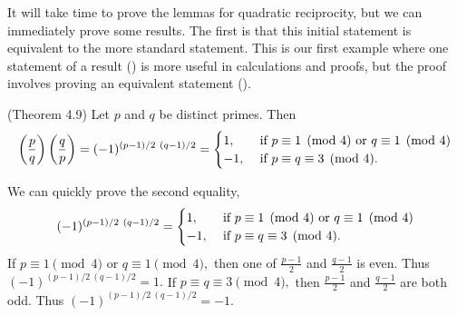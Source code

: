 \documentclass{ximera}
\begin{document}
It will take time to prove the lemmas for quadratic reciprocity, but we can immediately prove some results. 
The first is that this initial statement is equivalent to the more standard statement. This is our first example where one statement of a result () is more useful in calculations and proofs, but the proof involves proving an equivalent statement ().

\begin{theorem}\label{quad-rec-standard-form} (Theorem 4.9)
	Let $p$ and $q$ be distinct primes.  Then
	\[
		\legendre{p}{q}\legendre{q}{p}=(-1)^{(p-1)/2\ (q-1)/2}=
			\begin{cases}
 				1, & \textnormal{ if } p\equiv 1\pmod{4} \textnormal{ or } q\equiv 1\pmod{4}\\
				-1, & \textnormal{ if } p\equiv q\equiv 3\pmod{4}.
			\end{cases}
	\]
\end{theorem}

\begin{remark}
	We can quickly prove the second equality, 
		\[(-1)^{(p-1)/2\ (q-1)/2}=
			\begin{cases}
 				1, & \textnormal{ if } p\equiv 1\pmod{4} \textnormal{ or } q\equiv 1\pmod{4}\\
				-1, & \textnormal{ if } p\equiv q\equiv 3\pmod{4}.
			\end{cases}\]
	If $p\equiv 1\pmod{4}$ or $q\equiv 1\pmod{4},$ then one of $\frac{p-1}{2}$ and $\frac{q-1}{2}$ is even. Thus $(-1)^{(p-1)/2\ (q-1)/2}=1.$ If $p\equiv q\equiv 3\pmod{4},$ then $\frac{p-1}{2}$ and $\frac{q-1}{2}$ are both odd. Thus $(-1)^{(p-1)/2\ (q-1)/2}=-1.$
\end{remark}
\end{document}
